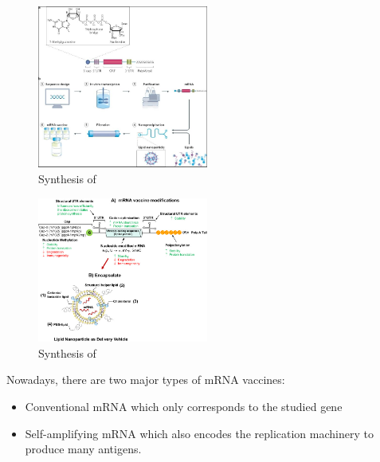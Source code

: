 \documentclass{article}
\begin{document}
            
            
            \begin{figure}
                \centering
                \includegraphics[width=0.5\textwidth]{imgs/mRNA_Vaccine.JPG}
                \caption{Synthesis of \autocite{MRNAVaccinesInfectious}}
                \label{fig:mRNAvac}
            \end{figure}
            
            \begin{figure}
                \centering
                \includegraphics[width=0.5\textwidth]{imgs/RNA2.jpg}
                \caption{Synthesis of \autocite{granados-riveronEngineeringCurrentNucleosidemodified2021}}
                \label{fig:mRNAvac2}
            \end{figure}

            Nowadays, there are two major types of mRNA vaccines:
            \begin{itemize}
                \item Conventional mRNA which only corresponds to the studied gene
                \item Self-amplifying mRNA which also encodes the replication machinery to produce many antigens.
            \end{itemize}
            
\end{document}
